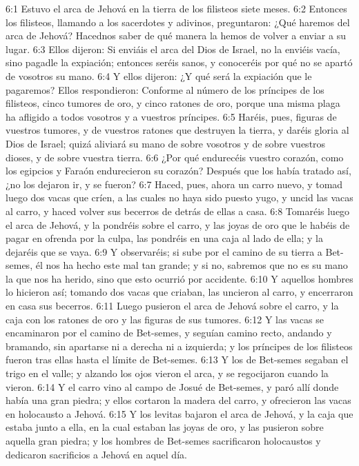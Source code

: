 6:1 Estuvo el arca de Jehová en la tierra de los filisteos siete meses.  
6:2 Entonces los filisteos, llamando a los sacerdotes y adivinos, preguntaron: ¿Qué haremos del arca de Jehová? Hacednos saber de qué manera la hemos de volver a enviar a su lugar.  
6:3 Ellos dijeron: Si enviáis el arca del Dios de Israel, no la enviéis vacía, sino pagadle la expiación; entonces seréis sanos, y conoceréis por qué no se apartó de vosotros su mano.  
6:4 Y ellos dijeron: ¿Y qué será la expiación que le pagaremos? Ellos respondieron: Conforme al número de los príncipes de los filisteos, cinco tumores de oro, y cinco ratones de oro, porque una misma plaga ha afligido a todos vosotros y a vuestros príncipes.  
6:5 Haréis, pues, figuras de vuestros tumores, y de vuestros ratones que destruyen la tierra, y daréis gloria al Dios de Israel; quizá aliviará su mano de sobre vosotros y de sobre vuestros dioses, y de sobre vuestra tierra.  
6:6 ¿Por qué endurecéis vuestro corazón, como los egipcios y Faraón endurecieron su corazón? Después que los había tratado así, ¿no los dejaron ir, y se fueron?  
6:7 Haced, pues, ahora un carro nuevo, y tomad luego dos vacas que críen, a las cuales no haya sido puesto yugo, y uncid las vacas al carro, y haced volver sus becerros de detrás de ellas a casa.  
6:8 Tomaréis luego el arca de Jehová, y la pondréis sobre el carro, y las joyas de oro que le habéis de pagar en ofrenda por la culpa, las pondréis en una caja al lado de ella; y la dejaréis que se vaya.  
6:9 Y observaréis; si sube por el camino de su tierra a Bet-semes, él nos ha hecho este mal tan grande; y si no, sabremos que no es su mano la que nos ha herido, sino que esto ocurrió por accidente.  
6:10 Y aquellos hombres lo hicieron así; tomando dos vacas que criaban, las uncieron al carro, y encerraron en casa sus becerros.  
6:11 Luego pusieron el arca de Jehová sobre el carro, y la caja con los ratones de oro y las figuras de sus tumores.  
6:12 Y las vacas se encaminaron por el camino de Bet-semes, y seguían camino recto, andando y bramando, sin apartarse ni a derecha ni a izquierda; y los príncipes de los filisteos fueron tras ellas hasta el límite de Bet-semes.  
6:13 Y los de Bet-semes segaban el trigo en el valle; y alzando los ojos vieron el arca, y se regocijaron cuando la vieron.  
6:14 Y el carro vino al campo de Josué de Bet-semes, y paró allí donde había una gran piedra; y ellos cortaron la madera del carro, y ofrecieron las vacas en holocausto a Jehová.  
6:15 Y los levitas bajaron el arca de Jehová, y la caja que estaba junto a ella, en la cual estaban las joyas de oro, y las pusieron sobre aquella gran piedra; y los hombres de Bet-semes sacrificaron holocaustos y dedicaron sacrificios a Jehová en aquel día.  
